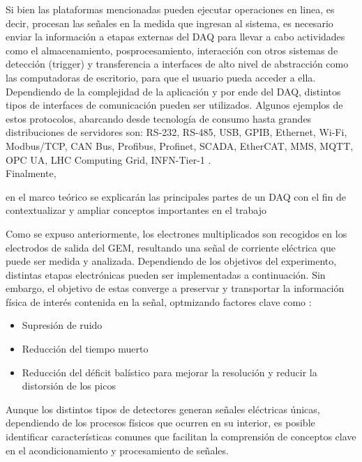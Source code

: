 \documentclass[]{book}
\begin{document}
\noindent Si bien las plataformas mencionadas pueden ejecutar operaciones en linea, es decir, procesan las señales en la medida que ingresan al sistema, es necesario enviar la información a etapas externas del DAQ para llevar a cabo actividades como el almacenamiento, posprocesamiento, interacción con otros sistemas de detección (trigger) y transferencia a interfaces de alto nivel de abstracción como las computadoras de escritorio, para que el usuario pueda acceder a ella. Dependiendo de la complejidad de la aplicación y por ende del DAQ, distintos tipos de interfaces de comunicación pueden ser utilizados. Algunos ejemplos de estos protocolos, abarcando desde tecnología de consumo hasta grandes distribuciones de servidores son: RS-232, RS-485, USB, GPIB, Ethernet, Wi-Fi, Modbus/TCP, CAN Bus, Profibus, Profinet, SCADA, EtherCAT, MMS, MQTT, OPC UA, LHC Computing Grid, INFN-Tier-1 \cite{zurawski2014industrial} \cite{bortolotti2012infn}.\\

\noindent Finalmente, 

en el marco teórico se explicarán las principales partes de un DAQ con el fin de contextualizar y ampliar conceptos importantes en el trabajo


\noindent Como se expuso anteriormente, los electrones multiplicados son recogidos en los electrodos de salida del GEM, resultando una señal de corriente eléctrica que puede ser medida y analizada. Dependiendo de los objetivos del experimento, distintas etapas electrónicas pueden ser implementadas a continuación. Sin embargo, el objetivo de estas converge a preservar y transportar la información física de interés contenida en la señal, optmizando factores clave como \cite{knoll2010radiation}:

\begin{itemize}
    \item Supresión de ruido 
    \item Reducción del tiempo muerto
    \item Reducción del déficit balístico para mejorar la resolución y reducir la distorsión de los picos
\end{itemize}

\noindent Aunque los distintos tipos de detectores generan señales eléctricas únicas, dependiendo de los procesos físicos que ocurren en su interior, es posible identificar características comunes que facilitan la comprensión de conceptos clave en el acondicionamiento y procesamiento de señales.
\end{document}

